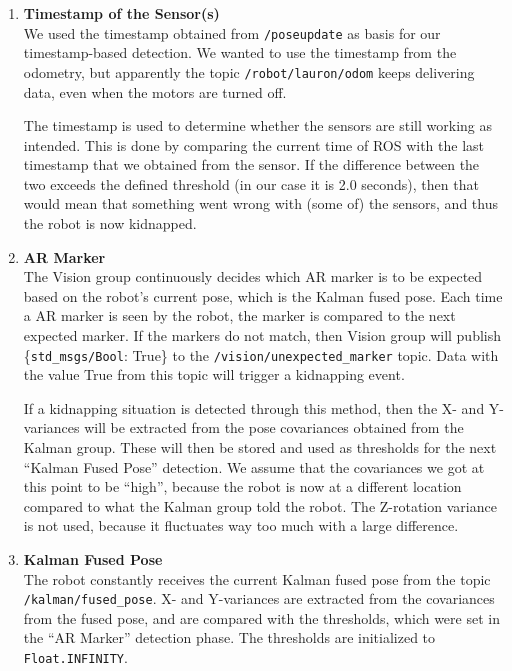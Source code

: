 \begin{enumerate}

\item \textbf{Timestamp of the Sensor(s)} \hfill \\
We used the timestamp obtained from \texttt{/poseupdate} as basis for our timestamp-based detection. We wanted to use the timestamp from the odometry, but apparently the topic \texttt{/robot/lauron/odom} keeps delivering data, even when the motors are turned off.

The timestamp is used to determine whether the sensors are still working as intended. This is done by comparing the current time of ROS with the last timestamp that we obtained from the sensor. If the difference between the two exceeds the defined threshold (in our case it is 2.0 seconds), then that would mean that something went wrong with (some of) the sensors, and thus the robot is now kidnapped.

\item \textbf{AR Marker} \hfill \\
The Vision group continuously decides which AR marker is to be expected based on the robot's current pose, which is the Kalman fused pose. Each time a AR marker is seen by the robot, the marker is compared to the next expected marker. If the markers do not match, then Vision group will publish \{\texttt{std\_msgs/Bool}: True\} to the  \texttt{/vision/unexpected\_marker} topic. Data with the value True from this topic will trigger a kidnapping event.

If a kidnapping situation is detected through this method, then the X- and Y-variances will be extracted from the pose covariances obtained from the Kalman group. These will then be stored and used as thresholds for the next ``Kalman Fused Pose'' detection. We assume that the covariances we got at this point to be ``high'', because the robot is now at a different location compared to what the Kalman group told the robot. The Z-rotation variance is not used, because it fluctuates way too much with a large difference.

\item \textbf{Kalman Fused Pose} \hfill \\
The robot constantly receives the current Kalman fused pose from the topic \\ \texttt{/kalman/fused\_pose}. X- and Y-variances are extracted from the covariances from the fused pose, and are compared with the thresholds, which were set in the ``AR Marker'' detection phase. The thresholds are initialized to \texttt{Float.INFINITY}.

\end{enumerate}

